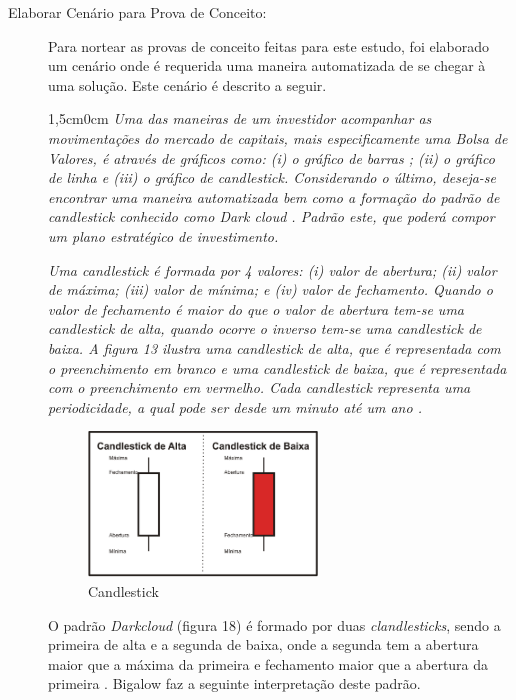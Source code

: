 \begin{description}
\item [Elaborar Cenário para Prova de Conceito:]
Para nortear as provas de conceito feitas para este estudo, foi elaborado um cenário onde é requerida uma maneira automatizada de se chegar à uma solução. Este cenário é descrito a seguir.

\begin{adjustwidth}{1,5cm}{0cm}
\textit{Uma das maneiras de um investidor acompanhar as movimentações do mercado de capitais, mais especificamente uma Bolsa de Valores, é através de gráficos como: (i) o gráfico de barras ; (ii) o gráfico de linha  e (iii) o gráfico de candlestick\cite[p. 5-6]{matsura2006}. Considerando o último, deseja-se encontrar uma maneira automatizada bem como a formação do padrão de candlestick conhecido como Dark cloud \cite[p.61]{matsura2006}. Padrão este, que poderá compor um plano estratégico de investimento.}

\textit{Uma candlestick é formada por 4 valores: (i) valor de abertura; (ii) valor de máxima; (iii) valor de mínima; e (iv) valor de fechamento. Quando o valor de  fechamento é maior do que o valor de abertura tem-se uma candlestick de alta, quando ocorre o inverso tem-se uma candlestick de baixa. A figura 13 ilustra uma candlestick de alta, que é representada com o preenchimento em branco e uma candlestick de baixa, que é representada com o preenchimento em vermelho. Cada candlestick representa uma periodicidade, a qual pode ser desde um minuto até um ano \cite[p.6]{matsura2006}.}
\end{adjustwidth}

\begin{figure}[h!]
\centering
\label{f13} 
\includegraphics[width=0.6\textwidth]{figuras/f10}
\caption{Candlestick }
\end{figure}
\FloatBarrier

O padrão \textit{Darkcloud} (figura 18) é formado por duas \textit{clandlesticks}, sendo a primeira de alta e a segunda de baixa, onde a segunda tem a abertura maior que a máxima da primeira e fechamento maior que a abertura da primeira \cite[p.61]{matsura2006}. Bigalow faz a seguinte interpretação deste padrão.


\end{description}
